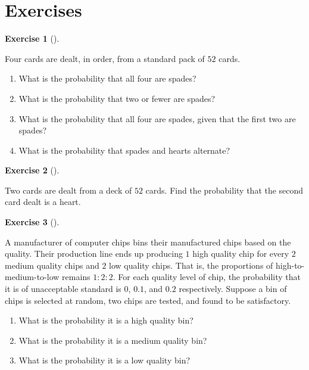 \documentclass[
  letterpaper,
  DIV=11,
  numbers=noendperiod]{scrreprt}
\providecommand{\tightlist}{%
  \setlength{\itemsep}{0pt}\setlength{\parskip}{0pt}}\usepackage{longtable,booktabs,array}
\theoremstyle{definition}
\theoremstyle{definition}
\newtheorem{exercise}{Exercise}[chapter]
\theoremstyle{definition}
\theoremstyle{remark}
\begin{document}
\section*{Exercises}\label{exercises-2}


\begin{exercise}[]\protect\hypertarget{exr-4.1}{}\label{exr-4.1}

Four cards are dealt, in order, from a standard pack of \(52\) cards.

\begin{enumerate}
\def\labelenumi{\alph{enumi}.}
\tightlist
\item
  What is the probability that all four are spades?
\item
  What is the probability that two or fewer are spades?
\item
  What is the probability that all four are spades, given that the first
  two are spades?
\item
  What is the probability that spades and hearts alternate?
\end{enumerate}

\end{exercise}

\begin{exercise}[]\protect\hypertarget{exr-4.2}{}\label{exr-4.2}

Two cards are dealt from a deck of \(52\) cards. Find the probability
that the second card dealt is a heart.

\end{exercise}

\begin{exercise}[]\protect\hypertarget{exr-4.3}{}\label{exr-4.3}

A manufacturer of computer chips bins their manufactured chips based on
the quality. Their production line ends up producing \(1\) high quality
chip for every \(2\) medium quality chips and \(2\) low quality chips.
That is, the proportions of high-to-medium-to-low remains \(1:2:2\). For
each quality level of chip, the probability that it is of unacceptable
standard is \(0\), \(0.1\), and \(0.2\) respectively. Suppose a bin of
chips is selected at random, two chips are tested, and found to be
satisfactory.

\begin{enumerate}
\def\labelenumi{\alph{enumi}.}
\tightlist
\item
  What is the probability it is a high quality bin?
\item
  What is the probability it is a medium quality bin?
\item
  What is the probability it is a low quality bin?
\end{enumerate}

\end{exercise}
\end{document}
